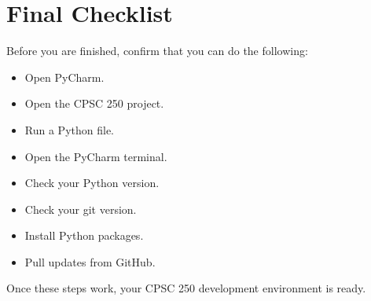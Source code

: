 \documentclass[11pt]{article}
\begin{document}
\section*{Final Checklist}

Before you are finished, confirm that you can do the following:

\begin{itemize}
    \item Open PyCharm.
    \item Open the CPSC 250 project.
    \item Run a Python file.
    \item Open the PyCharm terminal.
    \item Check your Python version.
    \item Check your git version.
    \item Install Python packages.
    \item Pull updates from GitHub.
\end{itemize}

Once these steps work, your CPSC 250 development environment is ready.
\end{document}
